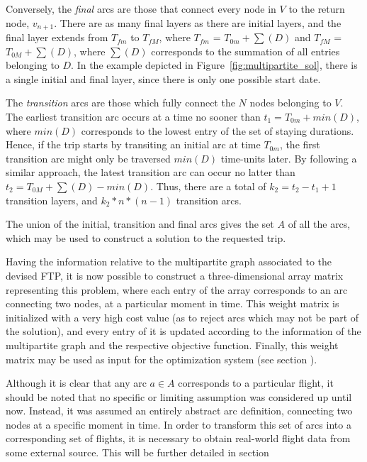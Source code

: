 Conversely, the \textit{final} arcs are those that connect every node in $V$ to
the return node, $v_{n+1}$. There are as many final layers as there are initial
layers, and the final layer extends from $T_{fm}$ to $T_{fM}$, where $T_{fm}$ =
$T_{0m} + \sum(D)$ and $T_{fM}$ = $T_{0M} + \sum(D)$, where $\sum(D)$
corresponds to the summation of all entries belonging to $D$. In the example
depicted in Figure~\ref{fig:multipartite_sol}, there is a single initial and
final layer, since there is only one possible start date.

The \textit{transition} arcs are those which fully connect the $N$ nodes
belonging to $V$. The earliest transition arc occurs at a time no sooner than
$t_1 = T_{0m} + min(D)$, where $min(D)$ corresponds to the lowest entry of the
set of staying durations. Hence, if the trip starts by transiting an initial arc
at time $T_{0m}$, the first transition arc might only be traversed $min(D)$
time-units later. By following a similar approach, the latest transition arc can
occur no latter than $t_2 = T_{0M} + \sum(D) - min(D)$. Thus, there are a total
of $k_2 = t_2-t_1+1$ transition layers, and $k_2*n*(n-1)$ transition arcs.

The union of the initial, transition and final arcs gives the set $A$ of all the
arcs, which may be used to construct a solution to the requested trip. 

Having the information relative to the multipartite graph associated to the
devised FTP, it is now possible to construct a three-dimensional array matrix
representing this problem, where each entry of the array corresponds to an arc
connecting two nodes, at a particular moment in time. This weight matrix is
initialized with a very high cost value (as to reject arcs which may not be part
of the solution), and every entry of it is updated according to the information
of the multipartite graph and the respective objective function. Finally, this
weight matrix may be used as input for the optimization system (see
section
).

Although it is clear that any arc $a \in A$ corresponds to a particular flight,
it should be noted that no specific or limiting assumption was considered up
until now. Instead, it was assumed an entirely abstract arc definition,
connecting two nodes at a specific moment in time. In order to transform this
set of arcs into a corresponding set of flights, it is necessary to obtain
real-world flight data from some external source. This will be further detailed
in section











